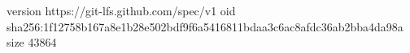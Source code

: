 version https://git-lfs.github.com/spec/v1
oid sha256:1f12758b167a8e1b28e502bdf9f6a5416811bdaa3c6ac8afdc36ab2bba4da98a
size 43864
